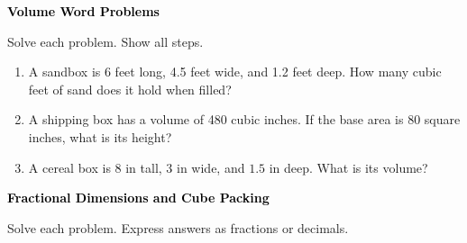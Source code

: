 \documentclass[12pt, letterpaper, fleqn]{article}
\begin{document}
\newpage

\begin{tcolorbox}[colback=black!10]
\large\textcolor{black}{\textbf{Volume Word Problems}}
\end{tcolorbox}

\noindent
Solve each problem. Show all steps.

\vspace{3mm}

\begin{enumerate}[itemsep=2.2cm, leftmargin=0.6cm]

\item A sandbox is 6 feet long, 4.5 feet wide, and 1.2 feet deep. How many cubic feet of sand does it hold when filled?

\vspace{2cm}

\item A shipping box has a volume of 480 cubic inches. If the base area is 80 square inches, what is its height?

\vspace{2cm}

\item A cereal box is $8\text{ in}$ tall, $3\text{ in}$ wide, and $1.5\text{ in}$ deep. What is its volume?

\vspace{2cm}

\end{enumerate}

\newpage

\begin{tcolorbox}[colback=black!10]
\large\textcolor{black}{\textbf{Fractional Dimensions and Cube Packing}}
\end{tcolorbox}

\noindent
Solve each problem. Express answers as fractions or decimals.

\vspace{3mm}
\end{document}
